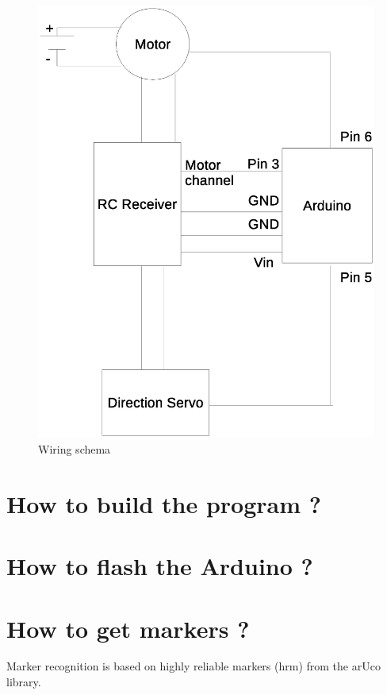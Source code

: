 \documentclass[a4paper,11pt]{report}
\begin{document}
\begin{figure}
\centering
\includegraphics[scale=0.5]{schema/wires.eps}
\caption{Wiring schema}
\label{fig:wires}
\end{figure}

\section{How to build the program ?}

\section{How to flash the Arduino ?}

\section{How to get markers ?}

Marker recognition is based on highly reliable markers (hrm) from the arUco
library.
\end{document}
